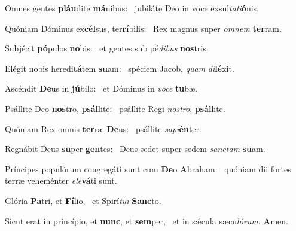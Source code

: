 \item Omnes gentes \textbf{pláu}dite \textbf{má}nibus:~\psstar{} jubiláte Deo in voce exsul\textit{tati}\textbf{ó}nis.
\item Quóniam Dóminus ex\textbf{cél}sus, ter\textbf{rí}bilis:~\psstar{} Rex magnus super \textit{omnem} \textbf{ter}ram.
\item Subjécit \textbf{pó}pulos \textbf{no}bis:~\psstar{} et gentes sub pé\textit{dibus} \textbf{nos}tris.
\item Elégit nobis heredi\textbf{tá}tem \textbf{su}am:~\psstar{} spéciem Jacob, \textit{quam} \textit{di}\textbf{lé}xit.
\item Ascéndit \textbf{De}us in \textbf{jú}bilo:~\psstar{} et Dóminus in \textit{voce} \textbf{tu}bæ.
\item Psállite Deo \textbf{nos}tro, \textbf{psál}lite:~\psstar{} psállite Regi \textit{nostro}, \textbf{psál}lite.
\item Quóniam Rex omnis \textbf{ter}ræ \textbf{De}us:~\psstar{} psállite \textit{sapi}\textbf{én}ter.
\item Regnábit Deus \textbf{su}per \textbf{gen}tes:~\psstar{} Deus sedet super sedem \textit{sanctam} \textbf{su}am.
\item Príncipes populórum congre\-gáti sunt cum \textbf{De}o \textbf{A}braham:~\psstar{} quóniam dii fortes terræ veheménter \textit{ele}\textbf{vá}ti sunt.
\item Glória \textbf{Pa}tri, et \textbf{Fí}lio,~\psstar{} et Spirí\textit{tui} \textbf{Sanc}to.
\item Sicut erat in princípio, et \textbf{nunc}, et \textbf{sem}per,~\psstar{} et in sǽcula sæcu\textit{lórum}. \textbf{A}men.
